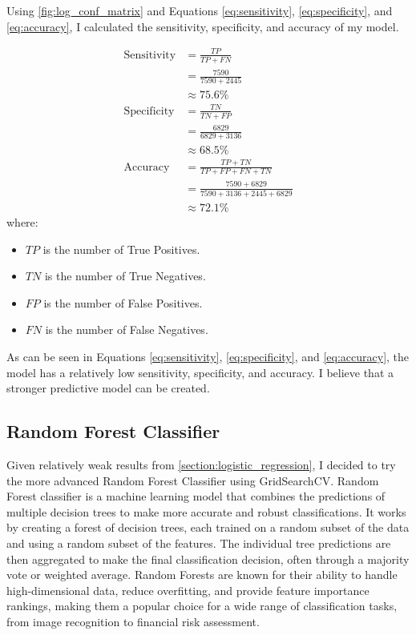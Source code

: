 \noindent
Using \cref{fig:log_conf_matrix} and Equations \ref{eq:sensitivity}, \ref{eq:specificity}, and \ref{eq:accuracy}, I calculated the sensitivity, specificity, and accuracy of my model.

\begin{align}
    \text{Sensitivity} &= \frac{TP}{TP + FN} \\ \label{eq:sensitivity}
    &= \frac{7590}{7590 + 2445} \\
    &\approx 75.6\% \\
    \text{Specificity} &= \frac{TN}{TN + FP} \\ \label{eq:specificity}
    &= \frac{6829}{6829 + 3136} \\
    &\approx 68.5\% \\
    \text{Accuracy} &= \frac{TP + TN}{TP + FP + FN + TN} \\ \label{eq:accuracy}
    &= \frac{7590 + 6829}{7590 + 3136 + 2445 + 6829} \\
    &\approx 72.1\% 
\end{align}
\noindent
where:
\begin{itemize}
    \item $TP$ is the number of True Positives.
    \item $TN$ is the number of True Negatives.
    \item $FP$ is the number of False Positives.
    \item $FN$ is the number of False Negatives.
\end{itemize}

\noindent
As can be seen in Equations \ref{eq:sensitivity}, \ref{eq:specificity}, and \ref{eq:accuracy}, the model has a relatively low sensitivity, specificity, and accuracy. I believe that a stronger predictive model can be created.

\subsection{Random Forest Classifier}
Given relatively weak results from \cref{section:logistic_regression}, I decided to try the more advanced Random Forest Classifier using GridSearchCV. Random Forest classifier is a machine learning model that combines the predictions of multiple decision trees to make more accurate and robust classifications. It works by creating a forest of decision trees, each trained on a random subset of the data and using a random subset of the features. The individual tree predictions are then aggregated to make the final classification decision, often through a majority vote or weighted average. Random Forests are known for their ability to handle high-dimensional data, reduce overfitting, and provide feature importance rankings, making them a popular choice for a wide range of classification tasks, from image recognition to financial risk assessment.

